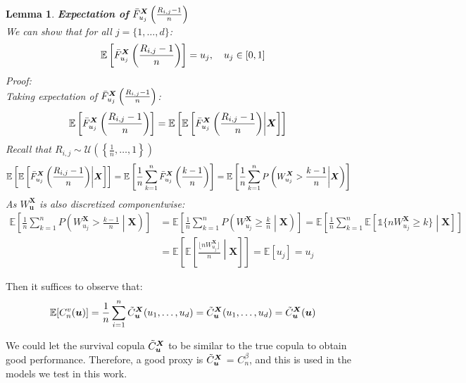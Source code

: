 \documentclass[12pt]{report}
\newtheorem{lemma}{Lemma}[subsection]
\newcommand{\1}{\mathbf{1}}
\begin{document}
\begin{lemma}\label{componentequalsu_j}
\textit{\normalfont\parencite{KojadinovicYi2024Smooth}}\:
\textbf{Expectation of} $\Bar{F}_{u_{j}}^{\boldsymbol{X}}\left(\frac{R_{i,j} - 1}{n}\right)$ \\
We can show that for all $j = \{1, \dots, d\}$: 
\begin{align*}
\mathbb{E} \left[ \Bar{F}_{u_{j}}^{\boldsymbol{X}}\left(\frac{R_{i,j} - 1}{n}\right) \right] = u_{j}, \quad u_{j} \in [0,1]
\end{align*}
Proof:\\
Taking expectation of $\Bar{F}_{u_{j}}^{\boldsymbol{X}}\left(\frac{R_{i,j} - 1}{n}\right)$:
\begin{align*}
\mathbb{E} \left[ \Bar{F}_{u_{j}}^{\boldsymbol{X}}\left(\frac{R_{i,j} - 1}{n}\right) \right] &= \mathbb{E} \left[ \mathbb{E} \left[ \Bar{F}_{u_{j}}^{\boldsymbol{X}}\left(\frac{R_{i,j} - 1}{n}\right) \middle| \boldsymbol{X} \right] \right]
\end{align*}
Recall that $R_{i,j} \sim \mathcal{U}\left(\left\{ \frac{1}{n}, \dots, 1 \right\}\right)$
\begin{align*}
\mathbb{E} \left[ \mathbb{E} \left[ \Bar{F}_{u_{j}}^{\boldsymbol{X}}\left(\frac{R_{i,j} - 1}{n}\right) \middle| \boldsymbol{X} \right] \right] &= \mathbb{E} \left[ \frac{1}{n} \sum\limits_{k = 1}^{n} \Bar{F}_{u_{j}}^{\boldsymbol{X}}\left(\frac{k - 1}{n}\right) \right] = \mathbb{E} \left[ \frac{1}{n} \sum\limits_{k = 1}^{n} P \left( W^{\boldsymbol{X}}_{u_{j}} > \frac{k - 1}{n} \middle| \boldsymbol{X} \right) \right]
\end{align*}
As $W^{\boldsymbol{X}}_{\boldsymbol{u}}$ is also discretized componentwise:
\begin{align*}
\mathbb{E} \left[ \frac{1}{n} \sum\limits_{k = 1}^{n} P \left( W^{\boldsymbol{X}}_{u_{j}} > \frac{k - 1}{n} \middle| \boldsymbol{X} \right) \right] &= \mathbb{E} \left[ \frac{1}{n} \sum\limits_{k = 1}^{n} P \left( W^{\boldsymbol{X}}_{u_{j}} \ge \frac{k}{n} \middle| \boldsymbol{X} \right) \right] = \mathbb{E} \left[ \frac{1}{n} \sum\limits_{k = 1}^{n} \mathbb{E} \left[ \mathds{1}\{ nW^{\boldsymbol{X}}_{u_{j}} \ge k \} \middle| \boldsymbol{X} \right] \right] \\ &= \mathbb{E} \left[ \mathbb{E} \left[ \frac{\lfloor nW^{\boldsymbol{X}}_{u_{j}} \rfloor}{n} \middle| \boldsymbol{X} \right] \right] = \mathbb{E} \left[ u_{j} \right] = u_{j}
\end{align*}
\end{lemma}

Then it suffices to observe that:
\begin{align*}
\mathbb{E}[C_{n}^{v}(\boldsymbol{u})] = \frac{1}{n} \sum\limits_{i = 1}^{n} \Tilde{C}^{\boldsymbol{X}}_{\boldsymbol{u}} ( u_{1}, \dots, u_{d} ) =  \Tilde{C}^{\boldsymbol{X}}_{\boldsymbol{u}} ( u_{1}, \dots, u_{d} ) = \Tilde{C}^{\boldsymbol{X}}_{\boldsymbol{u}} (\boldsymbol{u})
\end{align*}

We could let the survival copula $\Tilde{C}^{\boldsymbol{X}}_{\boldsymbol{u}}$ to be similar to the true copula to obtain good performance. Therefore, a good proxy is $\Tilde{C}^{\boldsymbol{X}}_{\boldsymbol{u}}$ = $C_{n}^{\beta}$, and this is used in the models we test in this work.
\end{document}
